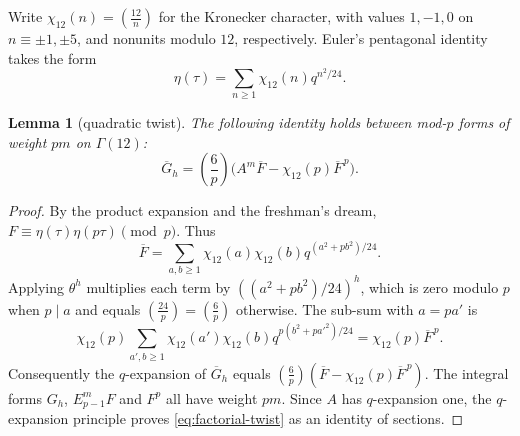 \documentclass[11pt,a4paper]{article}
\numberwithin{equation}{section}
\newtheorem{lemma}[theorem]{Lemma}
\theoremstyle{definition}
\theoremstyle{remark}
\newcommand{\leg}[2]{\left(\frac{#1}{#2}\right)}
\newcommand{\Lp}[1]{\left(\frac{#1}{p}\right)}
\begin{document}
Write $\chi_{12}(n)=\leg{12}{n}$ for the Kronecker character, with
values $1,-1,0$ on $n\equiv\pm1,\pm5$, and nonunits modulo $12$,
respectively. Euler's pentagonal identity \citep{Apostol90} takes the form
\[
\eta(\tau)=\sum_{n\ge1}\chi_{12}(n)q^{n^2/24}.
\]
\begin{lemma}[quadratic twist]\label{lem:factorial-twist}
The following identity holds between mod-$p$ forms of weight $pm$ on
$\Gamma(12)$:
\begin{equation}\label{eq:factorial-twist}
\overline G_h=\Lp6\bigl(A^m\overline F-\chi_{12}(p)\overline F^{\,p}\bigr).
\end{equation}
\end{lemma}
\begin{proof}
By the product expansion and the freshman's dream,
$F\equiv\eta(\tau)\eta(p\tau)\pmod p$. Thus
\[
\overline F=\sum_{a,b\ge1}\chi_{12}(a)\chi_{12}(b)
q^{(a^2+pb^2)/24}.
\]
Applying $\theta^h$ multiplies each term by
$((a^2+pb^2)/24)^h$, which is zero modulo $p$ when $p\mid a$
and equals $\leg{24}{p}=\Lp6$ otherwise.
The sub-sum with $a=pa'$ is
\[
\chi_{12}(p)\sum_{a',b\ge1}\chi_{12}(a')\chi_{12}(b)
q^{p(b^2+pa'^2)/24}
=\chi_{12}(p)\overline F^{\,p}.
\]
Consequently the $q$-expansion of $\overline G_h$ equals
$\Lp6(\overline F-\chi_{12}(p)\overline F^{\,p})$.
The integral forms $G_h$, $E_{p-1}^mF$ and $F^p$ all have weight
$pm$. Since $A$ has $q$-expansion one, the $q$-expansion principle
proves \eqref{eq:factorial-twist} as an identity of sections.
\end{proof}
\end{document}
